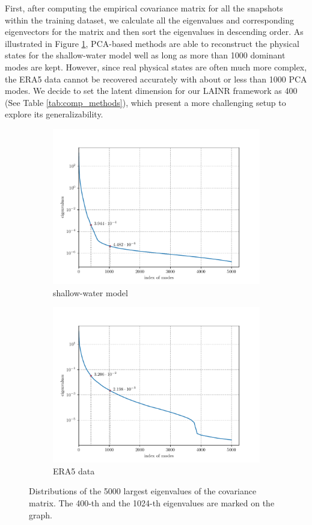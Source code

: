 \documentclass{article}
\begin{document}
First, after computing the empirical covariance matrix for all the snapshots within the training dataset, we calculate all the eigenvalues and corresponding eigenvectors for the matrix and then sort the eigenvalues in descending order. As illustrated in Figure \ref{fig:eigvals}, PCA-based methods are able to reconstruct the physical states for the shallow-water model well as long as more than 1000 dominant modes are kept. However, since real physical states are often much more complex, the ERA5 data cannot be recovered accurately with about or less than 1000 PCA modes. We decide to set the latent dimension for our LAINR framework as 400 (See Table \ref{tab:comp_methods}), which present a more challenging setup to explore its generalizability.
\begin{figure}
	\centering
	\begin{subfigure}{.4\textwidth}
		\includegraphics[width=\textwidth]{figs/eigvals_sw.pdf}
		\caption{shallow-water model}
	\end{subfigure}
	\begin{subfigure}{.4\textwidth}
		\includegraphics[width=\textwidth]{figs/eigvals_era5.pdf}
		\caption{ERA5 data}
	\end{subfigure}
	\caption{Distributions of the 5000 largest eigenvalues of the covariance matrix. The 400-th and the 1024-th eigenvalues are marked on the graph.}
	\label{fig:eigvals}
\end{figure}
\end{document}
